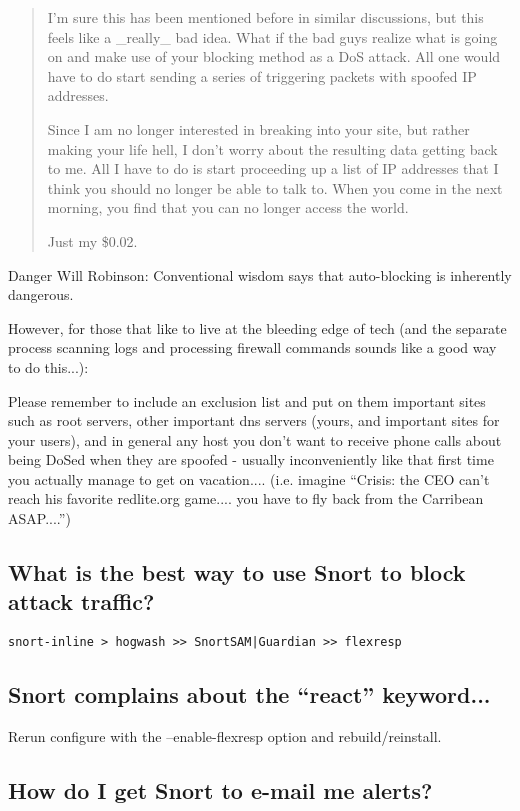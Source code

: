 \documentclass{article}
\newcommand{\myquote}[1]{\begin{quote}#1\end{quote}}
\begin{document}
\myquote{
I'm sure this has been mentioned before in similar discussions, but this
feels like a \_really\_ bad idea.  What if the bad guys realize what is
going on and make use of your blocking method as a DoS attack.  All one
would have to do start sending a series of triggering packets with spoofed
IP addresses.

Since I am no longer interested in breaking into your site, but rather
making your life hell, I don't worry about the resulting data getting back
to me.  All I have to do is start proceeding up a list of IP addresses
that I think you should no longer be able to talk to.  When you come in
the next morning, you find that you can no longer access the world.

Just my \$0.02.
}

Danger Will Robinson: Conventional wisdom says that 
auto-blocking is inherently dangerous. 

However, for those that like to live at the 
bleeding edge of tech (and the separate
process scanning logs and processing
firewall commands sounds like a good 
way to do this...):

Please remember to include an exclusion list and put 
on them important sites such as root servers, other 
important dns servers (yours, and important sites for 
your users), and in general any host you don't want 
to receive phone calls about being DoSed when
they are spoofed - usually inconveniently like that 
first time you actually manage to get on vacation....
(i.e. imagine ``Crisis: the CEO can't reach his favorite 
redlite.org game.... you have to fly back from the 
Carribean ASAP....'')   

\subsection{What is the best way to use Snort to block attack traffic?}

\begin{verbatim}snort-inline > hogwash >> SnortSAM|Guardian >> flexresp\end{verbatim}


\subsection{Snort complains about the ``react'' keyword...}

Rerun configure with the --enable-flexresp option and rebuild/reinstall.

\subsection{How do I get Snort to e-mail me alerts?}
\end{document}
